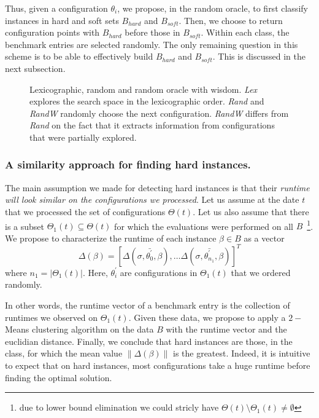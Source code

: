 \documentclass[10pt, conference, compsocconf]{IEEEtran}
\newcommand{\norm}[1]{\left\lVert#1\right\rVert}
\begin{document}
Thus, given a configuration $\theta_i$, we propose, in the random
oracle, to first classify instances in hard and soft sets $B_{hard}$
and $B_{soft}$. Then, we choose to return configuration points with
$B_{hard}$ before those in $B_{soft}$. Within each class, the
benchmark entries are selected randomly.  The only remaining question
in this scheme is to be able to effectively build $B_{hard}$ and
$B_{soft}$.  This is discussed in the next subsection.


	\begin{figure}[hbtp]
	\begin{center}
	
	\caption{Lexicographic, random and random oracle with wisdom.
        {\it Lex} explores the search space in the lexicographic order. {\it Rand}  and {\it RandW} 
        randomly choose the next configuration. {\it RandW} differs from {\it Rand} on the fact that 
        it extracts information from configurations that were partially explored.}
	\label{fig:Search}
	\end{center}
	\end{figure}


\subsubsection{A similarity approach for finding hard instances.}  

The main assumption we made for detecting hard instances is that their
{\it runtime will look similar on the configurations we processed}.
Let us assume at the date $t$ that we processed the set of
configurations $\Theta(t)$. Let us also assume that there is a subset
$\Theta_1(t) \subseteq \Theta(t)$ for which the evaluations were
performed on all $B$~\footnote{due to lower bound elimination we could
  stricly have $\Theta(t) \setminus \Theta_1(t) \neq \emptyset$}.  We
propose to characterize the runtime of each instance $\beta \in B$ as
a vector
\[ \Delta(\beta) = [\Delta(\sigma, \bar{\theta^{'}_0}, \beta), \dots
\Delta(\sigma, \bar{\theta^{'}_{n_1}}, \beta) ]^T \]
where $n_1 = |\Theta_1(t)|$. Here, $\theta^{'}_{i}$ are configurations
in $\Theta_1(t)$ that we ordered randomly.

In other words, the runtime vector of a benchmark entry is the
collection of runtimes we observed on $\Theta_1(t)$.  Given these
data, we propose to apply a $2-$Means clustering algorithm on the data
$B$ with the runtime vector and the euclidian distance. Finally, we
conclude that hard instances are those, in the class, for which the
mean value $\norm{\Delta(\beta)}$ is the greatest. Indeed, it is
intuitive to expect that on hard instances, most configurations take a
huge runtime before finding the optimal solution.
\end{document}

